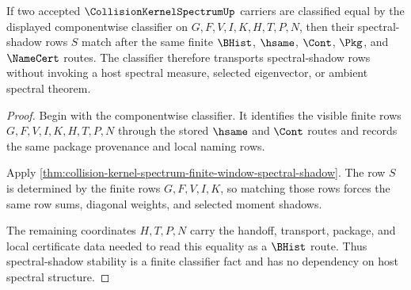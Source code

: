 \begin{theorem}
\label{thm:collision-kernel-spectrum-shadow-classifier-stability}
If two accepted $\CollisionKernelSpectrumUp$ carriers are classified equal by the displayed componentwise classifier on $G,F,V,I,K,H,T,P,N$, then their spectral-shadow rows $S$ match after the same finite $\BHist$, $\hsame$, $\Cont$, $\Pkg$, and $\NameCert$ routes. The classifier therefore transports spectral-shadow rows without invoking a host spectral measure, selected eigenvector, or ambient spectral theorem.
\end{theorem}
\begin{proof}
Begin with the componentwise classifier. It identifies the visible finite rows $G,F,V,I,K,H,T,P,N$ through the stored $\hsame$ and $\Cont$ routes and records the same package provenance and local naming rows.

Apply \autoref{thm:collision-kernel-spectrum-finite-window-spectral-shadow}. The row $S$ is determined by the finite rows $G,F,V,I,K$, so matching those rows forces the same row sums, diagonal weights, and selected moment shadows.

The remaining coordinates $H,T,P,N$ carry the handoff, transport, package, and local certificate data needed to read this equality as a $\BHist$ route. Thus spectral-shadow stability is a finite classifier fact and has no dependency on host spectral structure.
\end{proof}

